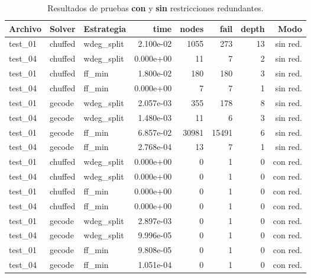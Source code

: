 \begin{compactfloats}
  \begin{table}[H]
    \centering
    \small
    \setlength{\tabcolsep}{1.8pt}
    \caption{Resultados de pruebas \textbf{con} y \textbf{sin} restricciones redundantes.}
    \label{tab:pruebas-reunion-redundancia}
    \begin{tabular}{l l l r r r r r}
      \toprule
      \textbf{Archivo} & \textbf{Solver} & \textbf{Estrategia} & \textbf{time} & \textbf{nodes} & \textbf{fail} & \textbf{depth} & \textbf{Modo} \\
      \midrule
      test\_01 & chuffed & wdeg\_split & 2.100e-02 & 1055 & 273 & 13 & sin red. \\
      test\_04 & chuffed & wdeg\_split & 0.000e+00 & 11 & 7 & 2 & sin red. \\
      test\_01 & chuffed & ff\_min & 1.800e-02 & 180 & 180 & 3 & sin red. \\
      test\_04 & chuffed & ff\_min & 0.000e+00 & 7 & 7 & 1 & sin red. \\
      \midrule
      test\_01 & gecode & wdeg\_split & 2.057e-03 & 355 & 178 & 8 & sin red. \\
      test\_04 & gecode & wdeg\_split & 1.480e-03 & 11 & 6 & 3 & sin red. \\
      test\_01 & gecode & ff\_min & 6.857e-02 & 30981 & 15491 & 6 & sin red. \\
      test\_04 & gecode & ff\_min & 2.768e-04 & 13 & 7 & 1 & sin red. \\
      \midrule
      test\_01 & chuffed & wdeg\_split & 0.000e+00 & 0 & 1 & 0 & con red. \\
      test\_04 & chuffed & wdeg\_split & 0.000e+00 & 0 & 1 & 0 & con red. \\
      test\_01 & chuffed & ff\_min & 0.000e+00 & 0 & 1 & 0 & con red. \\
      test\_04 & chuffed & ff\_min & 0.000e+00 & 0 & 1 & 0 & con red. \\
      \midrule
      test\_01 & gecode & wdeg\_split & 2.897e-03 & 0 & 1 & 0 & con red. \\
      test\_04 & gecode & wdeg\_split & 9.996e-05 & 0 & 1 & 0 & con red. \\
      test\_01 & gecode & ff\_min & 9.808e-05 & 0 & 1 & 0 & con red. \\
      test\_04 & gecode & ff\_min & 1.051e-04 & 0 & 1 & 0 & con red. \\
      \bottomrule
    \end{tabular}
  \end{table}
\end{compactfloats}

\FloatBarrier
